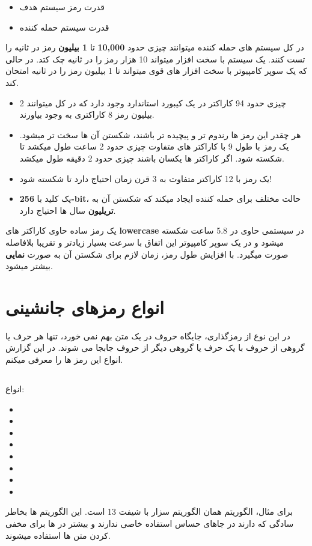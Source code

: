\begin{itemize}
    \item    
    قدرت رمز سیستم هدف
    \item
    قدرت سیستم حمله کننده
\end{itemize}
در کل سیستم های حمله کننده میتوانند چیزی حدود 
\textbf{10,000}
تا 
\textbf{1 بیلیون}
رمز در ثانیه را تست کنند.
یک سیستم با سخت افزار 
میتواند 10 هزار رمز را در ثانیه چک کتد.
در حالی که یک سوپر کامپیوتر با سخت افزار های قوی میتواند تا 1 بیلیون رمز را در ثانیه امتحان کند.
\begin{itemize}
    \item    
    چیزی حدود 94 کاراکتر در یک کیبورد استاندارد وجود دارد که در کل میتوانند 2 بیلیون رمز 8 کاراکتری به وجود بیاورند.
    \item
    هر چقدر این رمز ها رندوم تر و پیچیده تر باشند، شکستن آن ها سخت تر میشود. یک رمز با طول 9 با کاراکتر های متفاوت چیزی حدود 2 ساعت طول میکشد تا شکسته شود. اگر کاراکتر ها یکسان باشند چیزی حدود 2 دقیقه طول میکشد.
    \item
    یک رمز با 12 کاراکتر متفاوت به 3 قرن زمان احتیاج دارد تا شکسته شود!
    \item
    یک کلید با 
    \textbf{256-bit}،
    حالت مختلف برای حمله کننده ایجاد میکند که شکستن آن به 
    \textbf{تریلیون}
    سال ها احتیاج دارد.
\end{itemize}
یک رمز ساده حاوی کاراکتر های 
\textbf{lowercase}
در سیستمی حاوی 
در 5.8 ساعت شکسته میشود 
و در یک سوپر کامپیوتر این اتفاق با سرعت بسیار زیادتر و تقریبا بلافاصله صورت میگیرد.
با افزایش طول رمز، زمان لازم برای شکستن آن به صورت 
\textbf{نمایی}
بیشتر میشود.

\section{انواع رمزهای جانشینی}
در این نوع از رمزگذاری، جایگاه حروف در یک متن بهم نمی خورد، تنها هر حرف یا گروهی از حروف با یک
حرف یا گروهی دیگر از حروف جابجا می شوند.
در این گزارش انواع این رمز ها را معرفی میکنم.
\subsection{}
انواع:
\begin{itemize}
    \item   
    \item
    \item
    \item
    \item
    \item
    \item
    \item
\end{itemize}
برای مثال، الگوریتم 
همان الگوریتم سزار با شیفت 13 است.
این الگوریتم ها بخاطر سادگی که دارند در جاهای حساس استفاده خاصی ندارند و بیشتر در 
 ها
برای مخفی کردن متن ها استفاده میشوند.

